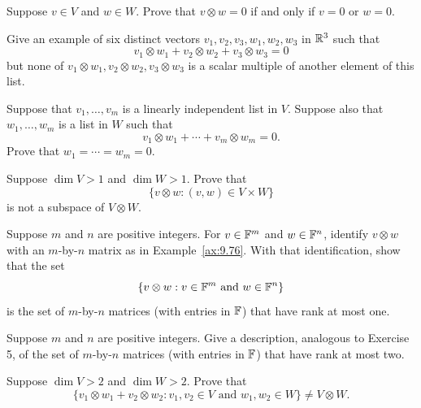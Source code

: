 \begin{exc}

\begin{exercise}
Suppose $v\in V$ and $w\in W$. Prove that $v\otimes w=0$ if and only if $v=0$
or $w=0$.
\end{exercise}

\begin{exercise}
Give an example of six distinct vectors $v_1,v_2,v_3,w_1,w_2,w_3$ in $\mathbb{R}^3$
such that
\[ v_1\otimes w_1+v_2\otimes w_2+v_3\otimes w_3 = 0 \]
but none of $v_1\otimes w_1,v_2\otimes w_2,v_3\otimes w_3$ is a scalar multiple
of another element of this list.
\end{exercise}

\begin{exercise}
Suppose that $v_1,\dots,v_m$ is a linearly independent list in $V$. Suppose
also that $w_1,\dots,w_m$ is a list in $W$ such that
\[ v_1\otimes w_1+\cdots+v_m\otimes w_m = 0. \]
Prove that $w_1=\cdots=w_m=0$.
\end{exercise}

\begin{exercise}
Suppose $\dim V>1$ and $\dim W>1$. Prove that
\[ \{v\otimes w : (v,w)\in V\times W\} \]
is not a subspace of $V\otimes W$.
\end{exercise}

\begin{exercise}
Suppose $m$ and $n$ are positive integers. For $v\in\mathbb{F}^m$ and $w\in\mathbb{F}^n$,
identify $v\otimes w$ with an $m$-by-$n$ matrix as in Example~\ref{ax:9.76}.
With that identification, show that the set
\[ \{v\otimes w : v\in\mathbb{F}^m \text{ and } w\in\mathbb{F}^n\} \]
is the set of $m$-by-$n$ matrices (with entries in $\mathbb{F}$) that have rank at most
one.
\end{exercise}

\begin{exercise}
Suppose $m$ and $n$ are positive integers. Give a description, analogous to
Exercise 5, of the set of $m$-by-$n$ matrices (with entries in $\mathbb{F}$) that have
rank at most two.
\end{exercise}

\begin{exercise}
Suppose $\dim V>2$ and $\dim W>2$. Prove that
\[ \{v_1\otimes w_1+v_2\otimes w_2 : v_1,v_2\in V \text{ and } w_1,w_2\in W\}
   \ne V\otimes W. \]
\end{exercise}


\end{exc}
